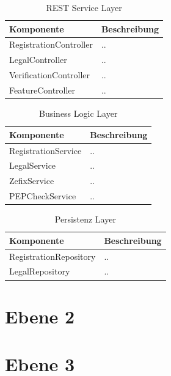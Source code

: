 \begin{table}[H]
	\centering
	\caption{REST Service Layer}
	\begin{tabular}{ | p{4cm} | p{12cm} | }
		\toprule
		{\textbf{Komponente}} & {\textbf{Beschreibung}} \\
		\midrule
		RegistrationController &  .. \\ \hline
		LegalController &  .. \\ \hline
		VerificationController &  .. \\ \hline
		FeatureController &  .. \\
		\bottomrule
	\end{tabular}
\end{table}

\begin{table}[H]
	\centering
	\caption{Business Logic Layer}
	\begin{tabular}{ | p{4cm} | p{12cm} | }
		\toprule
		{\textbf{Komponente}} & {\textbf{Beschreibung}} \\
		\midrule
		RegistrationService &  .. \\ \hline
		LegalService &  .. \\ \hline
		ZefixService &  .. \\ \hline
		PEPCheckService &  .. \\
		\bottomrule
	\end{tabular}
\end{table}

\begin{table}[H]
	\centering
	\caption{Persistenz Layer}
	\begin{tabular}{ | p{4cm} | p{12cm} | }
		\toprule
		{\textbf{Komponente}} & {\textbf{Beschreibung}} \\
		\midrule
		RegistrationRepository &  .. \\ \hline
		LegalRepository &  .. \\
		\bottomrule
	\end{tabular}
\end{table}

\section{Ebene 2}

\section{Ebene 3}